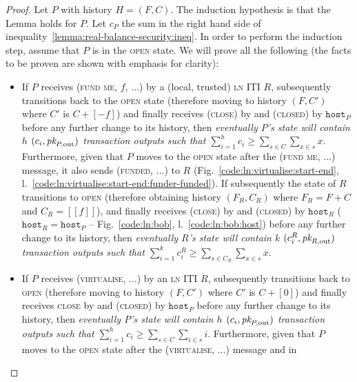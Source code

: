 \begin{proof}
  Let $P$ with history $H = (F, C)$. The induction hypothesis is that the Lemma
  holds for $P$. Let $c_P$ the sum in the right hand side of
  inequality~\ref{lemma:real-balance-security:ineq}. In order to perform the
  induction step, assume that $P$ is in the \textsc{open} state. We will prove
  all the following (the facts to be proven are shown with emphasis for
  clarity):
  \begin{itemize}
    \item If $P$ receives (\textsc{fund me}, $f$, $\dots$) by a (local, trusted)
    \textsc{ln} ITI $R$, subsequently transitions back to the \textsc{open}
    state (therefore moving to history $(F, C')$ where $C'$ is $C + [-f]$) and
    finally receives (\textsc{close}) by \environment and (\textsc{closed}) by
    $\texttt{host}_P$ before any further change to its history, then
    \emph{eventually $P$'s \ledger state will contain $h$ $(c_i, \textit{pk}_{P,
    \mathrm{out}})$ transaction outputs such that $\sum\limits_{i=1}^h c_i \geq
    \sum\limits_{s \in C} \sum\limits_{x \in s} x$}. Furthermore, given that $P$
    moves to the \textsc{open} state after the (\textsc{fund me}, $\dots$)
    message, it also sends (\textsc{funded}, $\dots$) to $R$
    (Fig.~\ref{code:ln:virtualise:start-end},
    l.~\ref{code:ln:virtualise:start-end:funder-funded}). If subsequently the
    state of $R$ transitions to \textsc{open} (therefore obtaining history
    $(F_R, C_R)$ where $F_R = F + C$ and $C_R = [[f]]$), and finally receives
    (\textsc{close}) by \environment and (\textsc{closed}) by $\texttt{host}_R$
    ($\texttt{host}_R = \texttt{host}_P$ -- Fig.~\ref{code:ln:bob},
    l.~\ref{code:ln:bob:host}) before any further change to its history, then
    \emph{eventually $R$'s \ledger state will contain $k$ $(c^R_i, \textit{pk}_{R,
    \mathrm{out}})$ transaction outputs such that $\sum\limits_{i=1}^k c^R_i
    \geq \sum\limits_{s \in C_R} \sum\limits_{x \in s} x$}.
    \item If $P$ receives (\textsc{virtualise}, $\dots$) by an \textsc{ln} ITI
    $R$, subsequently transitions back to \textsc{open} (therefore moving to
    history $(F, C')$ where $C'$ is $C + [0]$) and finally receives
    \textsc{close} by \environment and (\textsc{closed}) by $\texttt{host}_P$
    before any further change to its history, then \emph{eventually $P$'s
    \ledger state will contain $h$ $(c_i, \textit{pk}_{P, \mathrm{out}})$ transaction
    outputs such that $\sum\limits_{i=1}^h c_i \geq \sum\limits_{s \in C}
    \sum\limits_{i \in s} i$}. Furthermore, given that $P$ moves to the
    \textsc{open} state after the (\textsc{virtualise}, $\dots$) message and in

\end{itemize}
\end{proof}
